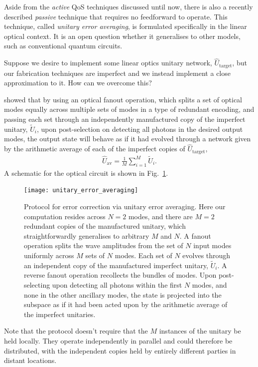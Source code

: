 Aside from the \textit{active} QoS techniques discussed until now, there is also a recently described \textit{passive} technique that requires no feedforward to operate. This technique, called \textit{unitary error averaging}, is formulated specifically in the linear optical context. It is an open question whether it generalises to other models, such as conventional quantum circuits.

Suppose we desire to implement some linear optics unitary network, $\hat{U}_\text{target}$, but our fabrication techniques are imperfect and we instead implement a close approximation to it. How can we overcome this?

\cite{MarshmanLundRohdeRalph} showed that by using an optical fanout operation, which splits a set of optical modes equally across multiple sets of modes in a type of redundant encoding, and passing each set through an independently manufactured copy of the imperfect unitary, $\tilde{U}_i$, upon post-selection on detecting all photons in the desired output modes, the output state will behave as if it had evolved through a network given by the arithmetic average of each of the imperfect copies of $\hat{U}_\text{target}$,
\begin{align}
\hat{U}_\text{av} = \frac{1}{M}\sum_{i=1}^M \tilde{U}_i.	
\end{align}
A schematic for the optical circuit is shown in Fig.~\ref{fig:error_av_circuit}.

\begin{figure}[!htb]
\texttt{[image: unitary\_error\_averaging]}
\caption{Protocol for error correction via unitary error averaging. Here our computation resides across \mbox{$N=2$} modes, and there are \mbox{$M=2$} redundant copies of the manufactured unitary, which straightforwardly generalises to arbitrary $M$ and $N$. A fanout operation splits the wave amplitudes from the set of $N$ input modes uniformly across $M$ sets of $N$ modes. Each set of $N$ evolves through an independent copy of the manufactured imperfect unitary, $\tilde{U}_i$. A reverse fanout operation recollects the bundles of modes. Upon post-selecting upon detecting all photons within the first $N$ modes, and none in the other ancillary modes, the state is projected into the subspace as if it had been acted upon by the arithmetic average of the imperfect unitaries.} \label{fig:error_av_circuit}	
\end{figure}

Note that the protocol doesn't require that the $M$ instances of the unitary be held locally. They operate independently in parallel and could therefore be distributed, with the independent copies held by entirely different parties in distant locations.

